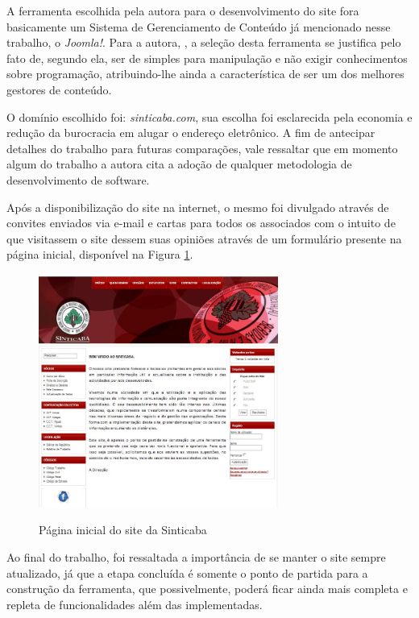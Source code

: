 A ferramenta escolhida pela autora para o desenvolvimento do site fora basicamente um Sistema de Gerenciamento de Conteúdo já mencionado nesse trabalho, o \textit{Joomla!}. Para a autora, , a seleção desta ferramenta se justifica pelo fato de, segundo ela, ser de simples para manipulação e não exigir conhecimentos sobre programação, atribuindo-lhe ainda a característica de ser um dos melhores gestores de conteúdo.

O domínio escolhido foi: \textit{sinticaba.com}, sua escolha foi esclarecida pela economia e redução da burocracia em alugar o endereço eletrônico. A fim de antecipar detalhes do trabalho para futuras comparações, vale ressaltar que em momento algum do trabalho a autora cita a adoção de qualquer metodologia de desenvolvimento de software.

Após a disponibilização do site na internet, o mesmo foi divulgado através de convites enviados via e-mail e cartas para todos os associados com o intuito de que visitassem o site dessem suas opiniões através de um formulário presente na página inicial, disponível na Figura \ref{pagina-inicial-sindicato}.

\begin{figure}[htb]
 \centering
 \caption{Página inicial do site da Sinticaba}
 \includegraphics[width=0.7\textwidth]{figuras/pInicial-Sindicato}
 \label{pagina-inicial-sindicato}
\end{figure}


Ao final do trabalho, foi ressaltada a importância de se manter o site sempre atualizado, já que a etapa concluída é somente o ponto de partida para a construção da ferramenta, que possivelmente, poderá ficar ainda mais completa e repleta de funcionalidades além das implementadas. 

